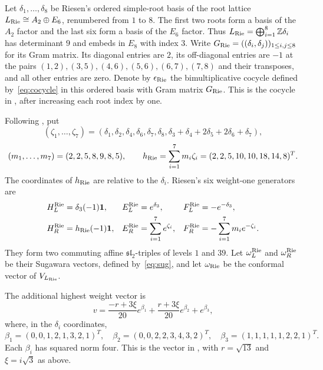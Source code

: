 \documentclass[11pt,reqno]{amsart}
\theoremstyle{definition}\newtheorem{definition}[theorem]{Definition}
\theoremstyle{remark}\newtheorem{remark}[theorem]{Remark}
\newcommand{\one}{\mathbf1}\newcommand{\slc}{\mathfrak{sl}_2}
\numberwithin{equation}{section}
\begin{document}
Let $\delta_1,\ldots,\delta_8$ be Riesen's ordered simple-root basis of the root lattice $L_{\rm Rie}\cong A_2\oplus E_6$, renumbered from $1$ to $8$. The first two roots form a basis of the $A_2$ factor and the last six form a basis of the $E_6$ factor. Thus $L_{\rm Rie}=\bigoplus_{i=1}^8\mathbb Z\delta_i$ has determinant $9$ and embeds in $E_8$ with index $3$. Write $G_{\rm Rie}=((\delta_i,\delta_j))_{1\le i,j\le8}$ for its Gram matrix. Its diagonal entries are $2$, its off-diagonal entries are $-1$ at the pairs
$(1,2),(3,5),(4,6),(5,6),(6,7),(7,8)$ and their transposes, and all other entries are zero.
Denote by $\epsilon_{\rm Rie}$ the bimultiplicative cocycle defined by~\eqref{eq:cocycle} in this ordered basis with Gram matrix $G_{\rm Rie}$. This is the cocycle in \cite[Appendix A.1]{RiesenLong}, after increasing each root index by one.

Following \cite[Appendix A.2]{RiesenLong}, put
\[
 (\zeta_1,\ldots,\zeta_7)
 =(\delta_1,\delta_2,\delta_4,\delta_6,\delta_7,\delta_8,
   \delta_3+\delta_4+2\delta_5+2\delta_6+\delta_7),
\]
\[
 (m_1,\ldots,m_7)=(2,2,5,8,9,8,5),\qquad
 h_{\rm Rie}=\sum_{i=1}^7m_i\zeta_i=(2,2,5,10,10,18,14,8)^T.
\]
The coordinates of $h_{\rm Rie}$ are relative to the $\delta_i$. Riesen's six weight-one generators are
\begin{align*}
 H_L^{\rm Rie}&=\delta_3(-1)\one,&
 E_L^{\rm Rie}&=e^{\delta_3},&
 F_L^{\rm Rie}&=-e^{-\delta_3},\\
 H_R^{\rm Rie}&=h_{\rm Rie}(-1)\one,&
 E_R^{\rm Rie}&=\sum_{i=1}^7e^{\zeta_i},&
 F_R^{\rm Rie}&=-\sum_{i=1}^7m_i e^{-\zeta_i}.
\end{align*}
They form two commuting affine $\slc$-triples of levels $1$ and $39$. Let $\omega_L^{\rm Rie}$ and $\omega_R^{\rm Rie}$ be their Sugawara vectors, defined by~\eqref{eq:sug}, and let $\omega_{\rm Rie}$ be the conformal vector of $V_{L_{\rm Rie}}$.

The additional highest weight vector is
\[
 v=\frac{-r+3\xi}{20}e^{\beta_1}
   +\frac{r+3\xi}{20}e^{\beta_2}+e^{\beta_3},
\]
where, in the $\delta_i$ coordinates,
\[
 \beta_1=(0,0,1,2,1,3,2,1)^T,\quad
 \beta_2=(0,0,2,2,3,4,3,2)^T,\quad
 \beta_3=(1,1,1,1,1,2,2,1)^T.
\]
Each $\beta_i$ has squared norm four. This is the vector in \cite[Definition 2.1 and Appendix E]{RiesenLong}, with $r=\sqrt{13}$ and $\xi=i\sqrt3$ as above.
\end{document}
